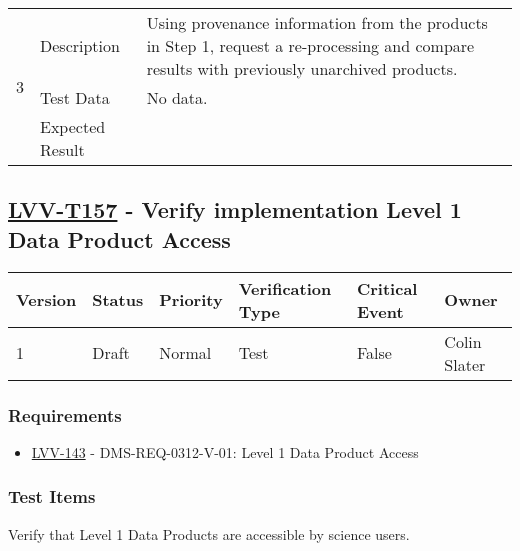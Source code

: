 \begin{longtable}[]{p{1.3cm}p{2cm}p{13cm}}
            \multirow{3}{*}{ 3 } & Description &
            \begin{minipage}[t]{13cm}{\footnotesize
            Using provenance information from the products in Step 1, request a
re-processing and compare results with previously unarchived products.

            \vspace{\dp0}
            } \end{minipage} \\ \cline{2-3}
            & Test Data &
            \begin{minipage}[t]{13cm}{\footnotesize
                No data.
                \vspace{\dp0}
            } \end{minipage} \\ \cline{2-3}
            & Expected Result &
        \\ \midrule
    \end{longtable}

\subsection{\href{https://jira.lsstcorp.org/secure/Tests.jspa\#/testCase/LVV-T157}{LVV-T157}
    - Verify implementation Level 1 Data Product Access}\label{lvv-t157}

\begin{longtable}[]{llllll}
\toprule
Version & Status & Priority & Verification Type & Critical Event & Owner
\\\midrule
1 & Draft & Normal &
Test & False & Colin Slater
\\\bottomrule
\end{longtable}

\subsubsection{Requirements}
\begin{itemize}
\item \href{https://jira.lsstcorp.org/browse/LVV-143}{LVV-143} - DMS-REQ-0312-V-01: Level 1 Data Product Access
\end{itemize}

\subsubsection{Test Items}
Verify that Level 1 Data Products are accessible by science users.



